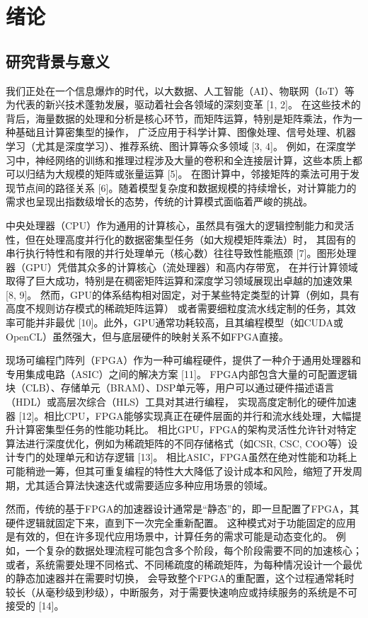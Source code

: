 \chapter{绪论}

\section{研究背景与意义}

我们正处在一个信息爆炸的时代，以大数据、人工智能（AI）、物联网（IoT）等为代表的新兴技术蓬勃发展，驱动着社会各领域的深刻变革 [1, 2]。
在这些技术的背后，海量数据的处理和分析是核心环节，而矩阵运算，特别是矩阵乘法，作为一种基础且计算密集型的操作，
广泛应用于科学计算、图像处理、信号处理、机器学习（尤其是深度学习）、推荐系统、图计算等众多领域 [3, 4]。
例如，在深度学习中，神经网络的训练和推理过程涉及大量的卷积和全连接层计算，这些本质上都可以归结为大规模的矩阵或张量运算 [5]。
在图计算中，邻接矩阵的乘法可用于发现节点间的路径关系 [6]。随着模型复杂度和数据规模的持续增长，对计算能力的需求也呈现出指数级增长的态势，传统的计算模式面临着严峻的挑战。

中央处理器（CPU）作为通用的计算核心，虽然具有强大的逻辑控制能力和灵活性，但在处理高度并行化的数据密集型任务（如大规模矩阵乘法）时，
其固有的串行执行特性和有限的并行处理单元（核心数）往往导致性能瓶颈 [7]。图形处理器（GPU）凭借其众多的计算核心（流处理器）和高内存带宽，
在并行计算领域取得了巨大成功，特别是在稠密矩阵运算和深度学习领域展现出卓越的加速效果 [8, 9]。
然而，GPU的体系结构相对固定，对于某些特定类型的计算（例如，具有高度不规则访存模式的稀疏矩阵运算）
或者需要细粒度流水线定制的任务，其效率可能并非最优 [10]。此外，GPU通常功耗较高，且其编程模型（如CUDA或OpenCL）虽然强大，但与底层硬件的映射关系不如FPGA直接。

现场可编程门阵列（FPGA）作为一种可编程硬件，提供了一种介于通用处理器和专用集成电路（ASIC）之间的解决方案 [11]。
FPGA内部包含大量的可配置逻辑块（CLB）、存储单元（BRAM）、DSP单元等，用户可以通过硬件描述语言（HDL）或高层次综合（HLS）工具对其进行编程，
实现高度定制化的硬件加速器 [12]。相比CPU，FPGA能够实现真正在硬件层面的并行和流水线处理，大幅提升计算密集型任务的性能功耗比。
相比GPU，FPGA的架构灵活性允许针对特定算法进行深度优化，例如为稀疏矩阵的不同存储格式（如CSR, CSC, COO等）设计专门的处理单元和访存逻辑 [13]。
相比ASIC，FPGA虽然在绝对性能和功耗上可能稍逊一筹，但其可重复编程的特性大大降低了设计成本和风险，缩短了开发周期，尤其适合算法快速迭代或需要适应多种应用场景的领域。

然而，传统的基于FPGA的加速器设计通常是“静态”的，即一旦配置了FPGA，其硬件逻辑就固定下来，直到下一次完全重新配置。
这种模式对于功能固定的应用是有效的，但在许多现代应用场景中，计算任务的需求可能是动态变化的。
例如，一个复杂的数据处理流程可能包含多个阶段，每个阶段需要不同的加速核心；
或者，系统需要处理不同格式、不同稀疏度的稀疏矩阵，为每种情况设计一个最优的静态加速器并在需要时切换，
会导致整个FPGA的重配置，这个过程通常耗时较长（从毫秒级到秒级），中断服务，对于需要快速响应或持续服务的系统是不可接受的 [14]。

